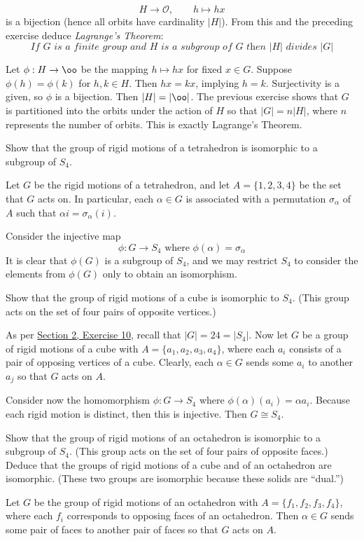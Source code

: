 \begin{problems}
    \[
    H \to \mathcal{O}, \qquad h \mapsto hx
    \]
    is a bijection (hence all orbits have cardinality $|H|$). From this and the preceding exercise deduce \textit{Lagrange's Theorem}:  
    \[\textit{If $G$ is a finite group and $H$ is a subgroup of $G$ then $|H|$ divides $|G|$}\]
    \begin{sol}
        Let $\phi : H \to \oo$ be the mapping $h \mapsto hx$ for fixed $x \in G$. Suppose $\phi(h) = \phi(k)$ for $h, k \in H$. Then $hx = kx$, implying $h = k$. Surjectivity is a given, so $\phi$ is a bijection. Then $|H| = |\oo|$. The previous exercise shows that $G$ is partitioned into the orbits under the action of $H$ so that $|G| = n|H|$, where $n$ represents the number of orbits. This is exactly Lagrange's Theorem. 
    \end{sol}
    \item \label{ex1.7.20}Show that the group of rigid motions of a tetrahedron is isomorphic to a subgroup of $S_4$.
    \begin{sol}
        Let $G$ be the rigid motions of a tetrahedron, and let $A = \{1, 2, 3, 4\}$ be the set that $G$ acts on. In particular, each $\alpha \in G$ is associated with a permutation $\sigma_\alpha$ of $A$ such that $\alpha i = \sigma_\alpha(i)$.
        
        Consider the injective map
        \[\phi : G \to S_4 \text{ where } \phi(\alpha) = \sigma_\alpha\]
        It is clear that $\phi(G)$ is a subgroup of $S_4$, and we may restrict $S_4$ to consider the elements from $\phi(G)$ only to obtain an isomorphism.
    \end{sol}
    \item Show that the group of rigid motions of a cube is isomorphic to $S_4$. (This group acts on the set of four pairs of opposite vertices.)
    \begin{sol}
        As per \hyperref[ex1.2.10]{Section 2, Exercise 10}, recall that $|G| = 24 = |S_4|$. Now let $G$ be a group of rigid motions of a cube with $A = \{a_1, a_2, a_3, a_4\}$, where each $a_i$ consists of a pair of opposing vertices of a cube. Clearly, each $\alpha \in G$ sends some $a_i$ to another $a_j$ so that $G$ acts on $A$.
        
        Consider now the homomorphism $\phi : G \to S_4$ where $\phi(\alpha)(a_i) = \alpha a_i$. Because each rigid motion is distinct, then this is injective. Then $G \cong S_4$.
    \end{sol}
    \item Show that the group of rigid motions of an octahedron is isomorphic to a subgroup of $S_4$.  
    (This group acts on the set of four pairs of opposite faces.) Deduce that the groups of rigid motions of a cube and of an octahedron are isomorphic. (These two groups are isomorphic because these solids are “dual.”)
    \begin{sol}
        Let $G$ be the group of rigid motions of an octahedron with $A = \{f_1, f_2, f_3, f_4\}$, where each $f_i$ corresponds to opposing faces of an octahedron. Then $\alpha \in G$ sends some pair of faces to another pair of faces so that $G$ acts on $A$.
        

\end{sol}
\end{problems}
